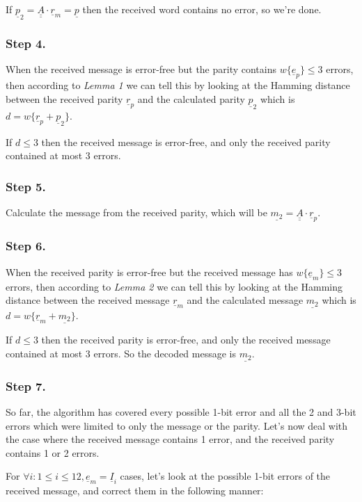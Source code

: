 \documentclass[11pt,a4paper,oneside]{report}             %
\def\doubleunderline#1{\underline{\underline{#1}}}
\def\dul#1{\doubleunderline{#1}}
\def\ul#1{\underline{#1}}
\begin{document}
If $\ul{p}_2 = \dul{A} \cdot \ul{r}_m = \ul{p}$ then the received word contains no error, so we're done.

\subsubsection{Step 4.}

When the received message is error-free but the parity contains $w\{\ul{e}_p\} \leq 3$ errors, then according to
\emph{Lemma 1} we can tell this by looking at the Hamming distance between the received parity $\ul{r}_p$ and
the calculated parity $\ul{p}_2$ which is $d = w\{\ul{r}_p + \ul{p}_2\}$.

If $d \leq 3$ then the received message is error-free, and only the received parity contained at most 3 errors.

\subsubsection{Step 5.}

Calculate the message from the received parity, which will be $\ul{m_2} = \dul{A} \cdot \ul{r}_p$.

\subsubsection{Step 6.}

When the received parity is error-free but the received message has $w\{\ul{e}_m\} \leq 3$ errors, then according to
\emph{Lemma 2} we can tell this by looking at the Hamming distance between the received message $\ul{r}_m$
and the calculated message $\ul{m_2}$ which is $d = w\{\ul{r}_m + \ul{m_2}\}$.

If $d \leq 3$ then the received parity is error-free, and only the received message contained at most 3 errors.
So the decoded message is $\ul{m_2}$.

\subsubsection{Step 7.}

So far, the algorithm has covered every possible 1-bit error and all the 2 and 3-bit errors which were
limited to only the message or the parity. Let's now deal with the case where the received message contains 1 error,
and the received parity contains 1 or 2 errors.

For $\forall i : 1 \leq i \leq 12, \ul{e}_m = \ul{I}_i$ cases, let's look at the possible 1-bit errors of the
received message, and correct them in the following manner:
\end{document}
